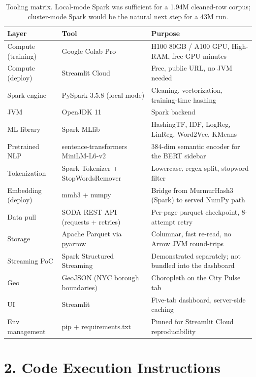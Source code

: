 \documentclass[11pt,letterpaper]{article}
\begin{document}
\begin{table}[h]
\centering
\small
\begin{tabular}{lll}
\toprule
\textbf{Layer} & \textbf{Tool} & \textbf{Purpose} \\
\midrule
Compute (training) & Google Colab Pro & H100 80GB / A100 GPU, High-RAM, free GPU minutes \\
Compute (deploy) & Streamlit Cloud & Free, public URL, no JVM needed \\
Spark engine & PySpark 3.5.8 (local mode) & Cleaning, vectorization, training-time hashing \\
JVM & OpenJDK 11 & Spark backend \\
ML library & Spark MLlib & HashingTF, IDF, LogReg, LinReg, Word2Vec, KMeans \\
Pretrained NLP & sentence-transformers MiniLM-L6-v2 & 384-dim semantic encoder for the BERT sidebar \\
Tokenization & Spark Tokenizer + StopWordsRemover & Lowercase, regex split, stopword filter \\
Embedding (deploy) & mmh3 + numpy & Bridge from MurmurHash3 (Spark) to served NumPy path \\
Data pull & SODA REST API (requests + retries) & Per-page parquet checkpoint, 8-attempt retry \\
Storage & Apache Parquet via pyarrow & Columnar, fast re-read, no Arrow JVM round-trips \\
Streaming PoC & Spark Structured Streaming & Demonstrated separately; not bundled into the dashboard \\
Geo & GeoJSON (NYC borough boundaries) & Choropleth on the City Pulse tab \\
UI & Streamlit & Five-tab dashboard, server-side caching \\
Env management & pip + requirements.txt & Pinned for Streamlit Cloud reproducibility \\
\bottomrule
\end{tabular}
\caption{Tooling matrix. Local-mode Spark was sufficient for a 1.94M cleaned-row corpus; cluster-mode Spark would be the natural next step for a 43M run.}
\end{table}

\newpage
\section{2. Code Execution Instructions}
\end{document}
